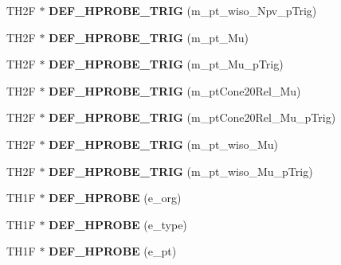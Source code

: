 \begin{DoxyCompactItemize}
\item 
\hypertarget{classHistos__Fake_a4f44998a43b0684f9f8471930b0eb820}{
TH2F $\ast$ {\bfseries DEF\_\-HPROBE\_\-TRIG} (m\_\-pt\_\-wiso\_\-Npv\_\-pTrig)}
\label{classHistos__Fake_a4f44998a43b0684f9f8471930b0eb820}

\item 
\hypertarget{classHistos__Fake_abe59e5b71ee954b7dfda395f71adf26f}{
TH2F $\ast$ {\bfseries DEF\_\-HPROBE\_\-TRIG} (m\_\-pt\_\-Mu)}
\label{classHistos__Fake_abe59e5b71ee954b7dfda395f71adf26f}

\item 
\hypertarget{classHistos__Fake_ab5dc271f04a933f9733400a0955fa392}{
TH2F $\ast$ {\bfseries DEF\_\-HPROBE\_\-TRIG} (m\_\-pt\_\-Mu\_\-pTrig)}
\label{classHistos__Fake_ab5dc271f04a933f9733400a0955fa392}

\item 
\hypertarget{classHistos__Fake_af3c6f4033b5c71ac69fbbc47a06f4339}{
TH2F $\ast$ {\bfseries DEF\_\-HPROBE\_\-TRIG} (m\_\-ptCone20Rel\_\-Mu)}
\label{classHistos__Fake_af3c6f4033b5c71ac69fbbc47a06f4339}

\item 
\hypertarget{classHistos__Fake_a1fbb7106591a264aa587333ea168dfaf}{
TH2F $\ast$ {\bfseries DEF\_\-HPROBE\_\-TRIG} (m\_\-ptCone20Rel\_\-Mu\_\-pTrig)}
\label{classHistos__Fake_a1fbb7106591a264aa587333ea168dfaf}

\item 
\hypertarget{classHistos__Fake_a19bde15fbf0278dc9a13282862e8bb23}{
TH2F $\ast$ {\bfseries DEF\_\-HPROBE\_\-TRIG} (m\_\-pt\_\-wiso\_\-Mu)}
\label{classHistos__Fake_a19bde15fbf0278dc9a13282862e8bb23}

\item 
\hypertarget{classHistos__Fake_ab916ba990e4f9ad92b196ea73ce3f787}{
TH2F $\ast$ {\bfseries DEF\_\-HPROBE\_\-TRIG} (m\_\-pt\_\-wiso\_\-Mu\_\-pTrig)}
\label{classHistos__Fake_ab916ba990e4f9ad92b196ea73ce3f787}

\item 
\hypertarget{classHistos__Fake_a96f64edcebd0a67745e99ee596208c30}{
TH1F $\ast$ {\bfseries DEF\_\-HPROBE} (e\_\-org)}
\label{classHistos__Fake_a96f64edcebd0a67745e99ee596208c30}

\item 
\hypertarget{classHistos__Fake_a2f7ceb6ba026b4c04bd71fc31c0b1374}{
TH1F $\ast$ {\bfseries DEF\_\-HPROBE} (e\_\-type)}
\label{classHistos__Fake_a2f7ceb6ba026b4c04bd71fc31c0b1374}

\item 
\hypertarget{classHistos__Fake_a5f8e5ba131d32dcb43a298a078b321fd}{
TH1F $\ast$ {\bfseries DEF\_\-HPROBE} (e\_\-pt)}
\label{classHistos__Fake_a5f8e5ba131d32dcb43a298a078b321fd}


\end{DoxyCompactItemize}

